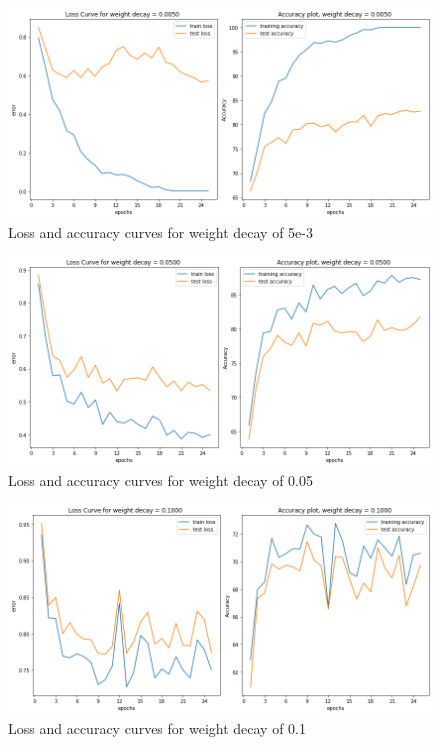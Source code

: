 \documentclass{article}
\begin{document}
\begin{figure}[h]
	\centering
	\includegraphics[scale=0.3]{../code/images/decay0.005.png}
	\caption{Loss and accuracy curves for weight decay of 5e-3}
	\label{fig:decay2}
\end{figure}\begin{figure}[h]
	\centering
	\includegraphics[scale=0.3]{../code/images/decay0.05.png}
	\caption{Loss and accuracy curves for weight decay of 0.05}
	\label{fig:decay3}
\end{figure}\begin{figure}[h]
	\centering
	\includegraphics[scale=0.3]{../code/images/decay0.1.png}
	\caption{Loss and accuracy curves for weight decay of 0.1}
	\label{fig:decay4}
\end{figure}
\end{document}
